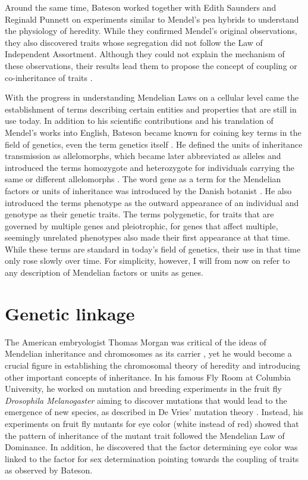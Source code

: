 Around the same time, Bateson worked together with Edith Saunders and Reginald Punnett on experiments similar to Mendel's pea hybrids to understand the physiology of heredity. While they confirmed Mendel's original observations, they also discovered traits whose segregation did not follow the Law of Independent Assortment. Although they could not explain the mechanism of these observations, their results lead them to propose the concept of coupling or co-inheritance of traits \citep{Bateson1905}. 

With the progress in understanding Mendelian Laws on a cellular level came the establishment of terms describing certain entities and properties that are still in use today. In addition to his scientific contributions and his translation of Mendel's works into English, Bateson became known for coining key terms in the field of genetics, even the term genetics itself \citep{Dunwell2007}. He defined the units of inheritance transmission as allelomorphs, which became later abbreviated as alleles and introduced the terms homozygote and heterozygote for individuals carrying the same or different allelomorphs \citep{Bateson1902}. The word gene as a term for the Mendelian factors or units of inheritance was introduced by the Danish botanist \citet{Johannsen1911}. He also introduced the terms phenotype as the outward appearance of an individual and genotype as their genetic traits. The terms polygenetic, for traits that are governed by multiple genes \citep{East1910} and pleiotrophic, for genes that affect multiple, seemingly unrelated phenotypes \citep[page 597]{Plate1910} also made their first appearance at that time. While these terms are standard in today's field of genetics, their use in that time only rose slowly over time. For simplicity, however, I will from now on refer to any description of Mendelian factors or units as genes. 

\section{Genetic linkage}
The American embryologist Thomas Morgan was critical of the ideas of Mendelian inheritance and chromosomes as its carrier \citep{Allen1968}, yet he would become a crucial figure in establishing the chromosomal theory of heredity and introducing other important concepts of inheritance. In his famous Fly Room at Columbia University, he worked on mutation and breeding experiments in the fruit fly \textit{Drosophila Melanogaster} aiming to discover mutations that would lead to the emergence of new species, as described in De Vries' mutation theory \citep{Allen1968}. Instead, his experiments on fruit fly mutants for eye color (white instead of red) showed that the pattern of inheritance of the mutant trait followed the Mendelian Law of Dominance. In addition, he discovered that the factor determining eye color was linked to the factor for sex determination \citep{Morgan1910,Morgan1911a} pointing towards the coupling of traits as observed by Bateson.

